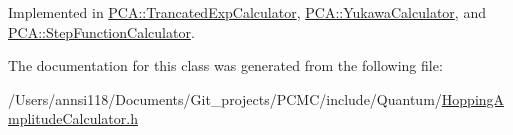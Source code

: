 Implemented in \hyperlink{class_p_c_a_1_1_trancated_exp_calculator_afe48461b23fd2b0d350f32bdac0c3d18}{P\+C\+A\+::\+Trancated\+Exp\+Calculator}, \hyperlink{class_p_c_a_1_1_yukawa_calculator_a543f237d55350a7669f8b85789cae68d}{P\+C\+A\+::\+Yukawa\+Calculator}, and \hyperlink{class_p_c_a_1_1_step_function_calculator_a0607e2f78b6b7c0ed40083f921b58fdc}{P\+C\+A\+::\+Step\+Function\+Calculator}.



The documentation for this class was generated from the following file\+:\begin{DoxyCompactItemize}
\item 
/\+Users/annsi118/\+Documents/\+Git\+\_\+projects/\+P\+C\+M\+C/include/\+Quantum/\hyperlink{_hopping_amplitude_calculator_8h}{Hopping\+Amplitude\+Calculator.\+h}\end{DoxyCompactItemize}

